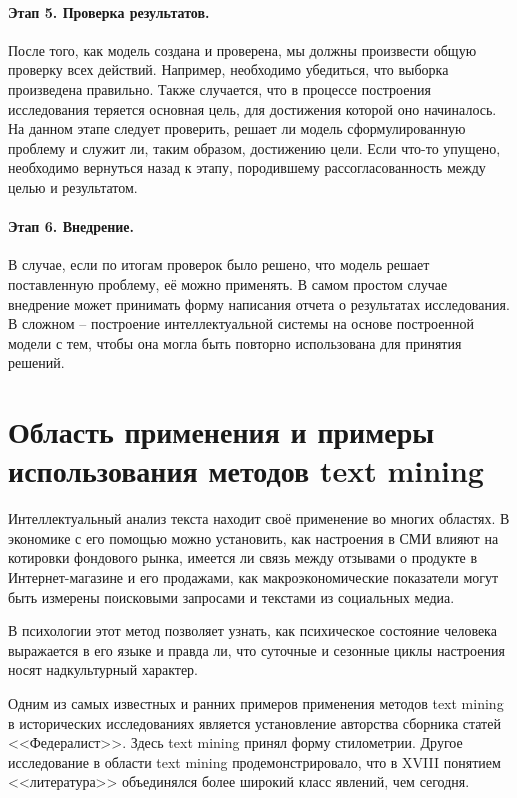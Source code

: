 \paragraph{Этап 5. Проверка результатов.} После того, как модель создана и проверена, мы должны произвести общую проверку всех действий. Например, необходимо убедиться, что выборка произведена правильно. Также случается, что в процессе построения исследования теряется основная цель, для достижения которой оно начиналось. На данном этапе следует проверить, решает ли модель сформулированную проблему и служит ли, таким образом, достижению цели. Если что-то упущено, необходимо вернуться назад к этапу, породившему рассогласованность между целью и результатом.
\paragraph{Этап 6. Внедрение.} В случае, если по итогам проверок было решено, что модель решает поставленную проблему, её можно применять. В самом простом случае внедрение может принимать форму написания отчета о результатах исследования. В сложном -- построение интеллектуальной системы на основе построенной модели с тем, чтобы она могла быть повторно использована для принятия решений.

\section{Область применения и примеры использования методов text mining} \label{sect1_4}

Интеллектуальный анализ текста находит своё применение во многих областях. В экономике с его помощью можно установить, как настроения в СМИ влияют на котировки фондового рынка\cite{Tetlock2007}, имеется ли связь между отзывами о продукте в Интернет-магазине и его продажами\cite{mining_consumer_reviews}, как макроэкономические показатели могут быть измерены поисковыми запросами\cite{Google_econometrics} и текстами из социальных медиа.

В психологии этот метод позволяет узнать, как психическое состояние человека выражается в его языке\cite{psychological_meaning} и правда ли, что суточные и сезонные циклы настроения носят надкультурный характер\cite{seasonal_mood}.

Одним из самых известных и ранних примеров применения методов text mining в исторических исследованиях является установление авторства сборника статей <<Федералист>>\cite{federalist}. Здесь text mining принял форму стилометрии. Другое исследование в области text mining продемонстрировало, что в XVIII понятием <<литература>> объединялся более широкий класс явлений, чем сегодня\cite{encyclopedie}. 

